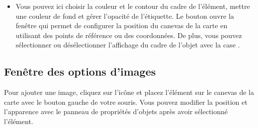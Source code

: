 \begin{itemize}[label=--]
\item Vous pouvez ici choisir la couleur et le contour du cadre de l'élément, mettre une couleur de fond et gérer l'opacité de l'étiquette. Le bouton  ouvre la fenêtre  qui permet de configurer la position du canevas de la carte en utilisant des points de référence ou des coordonnées. De plus, vous pouvez sélectionner ou désélectionner l'affichage du cadre de l'objet avec la case .
\end{itemize}

\subsection{ Fenêtre des options d'images}

Pour ajouter une image, cliquez sur l'icône  et placez l'élément sur le canevas de la carte avec le bouton gauche de votre souris. Vous pouvez modifier la position et l'apparence avec le panneau de propriétés d'objets après avoir sélectionné l'élément.


